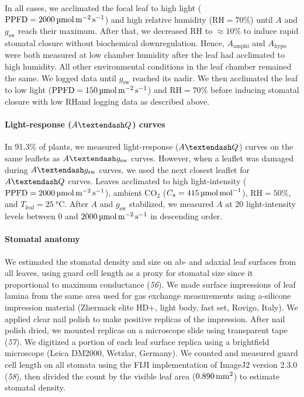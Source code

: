 \documentclass[
  letterpaper,
  DIV=11,
  numbers=noendperiod]{scrartcl}
\let\oldparagraph\paragraph
\renewcommand{\paragraph}[1]{\oldparagraph{#1}\mbox{}}
\newcommand{\Aamphi}{$A_{\mathrm{amphi}}$}
\newcommand{\Ahypo}{$A_{\mathrm{hypo}}$}
\newcommand{\agcurve}{$A \textendash g_\text{sw}$}
\newcommand{\aqcurve}{$A \textendash Q$}
\newcommand{\caequals}[1]{$C_\mathrm{a} = \qty{#1}{\micro\mol\raiseto{-1}\mol}$}
\newcommand{\gsw}{$g_\text{sw}$}
\newcommand{\ppfdequals}[1]{$\mathrm{PPFD} = \qty{#1}{\micro\mol\raiseto{-2}\meter\raiseto{-1}\second}$}
\newcommand{\rh}{$\mathrm{RH}$}
\newcommand{\rhequals}[1]{$\mathrm{RH} = #1\%$}
\newcommand{\tleafequals}[1]{$T_\mathrm{leaf} = \qty{#1}{\degreeCelsius}$}
\begin{document}
In all cases, we acclimated the focal leaf to high light
(\ppfdequals{2000}) and high relative humidity (\rhequals{70}) until
\(A\) and \gsw{} reach their maximum. After that, we decreased \rh{} to
\(\approx 10\%\) to induce rapid stomatal closure without biochemical
downregulation. Hence, \Aamphi{} and \Ahypo{} were both measured at low
chamber humidity after the leaf had acclimated to high humidity. All
other environmental conditions in the leaf chamber remained the same. We
logged data until \gsw{} reached its nadir. We then acclimated the leaf
to low light (\ppfdequals{150}) and \rhequals{70} before inducing
stomatal closure with low \rh and logging data as described above.

\paragraph{\texorpdfstring{Light-response (\aqcurve)
curves}{Light-response () curves}}\label{light-response-curves}

In 91.3\% of plants, we measured light-response (\aqcurve) curves on the
same leaflets as \agcurve{} curves. However, when a leaflet was damaged
during \agcurve{} curves, we used the next closest leaflet for
\aqcurve{} curves. Leaves acclimated to high light-intensity
(\ppfdequals{2000}), ambient CO\(_2\) (\caequals{415}), \rhequals{50},
and \tleafequals{25}. After \(A\) and \gsw{} stabilized, we measured
\(A\) at 20 light-intensity levels between \(0\) and
\(\qty{2000}{\micro\mol\raiseto{-2}\meter\raiseto{-1}\second}\) in
descending order.

\paragraph{Stomatal anatomy}\label{stomatal-anatomy}

We estimated the stomatal density and size on ab- and adaxial leaf
surfaces from all leaves, using guard cell length as a proxy for
stomatal size since it proportional to maximum conductance (\emph{56}).
We made surface impressions of leaf lamina from the same area used for
gas exchange measurements using a-silicone impression material (Zhermack
elite HD+, light body, fast set, Rovigo, Italy). We applied clear nail
polish to make positive replicas of the impression. After nail polish
dried, we mounted replicas on a microscope slide using transparent tape
(\emph{57}). We digitized a portion of each leaf surface replica using a
brightfield microscope (Leica DM2000, Wetzlar, Germany). We counted and
measured guard cell length on all stomata using the FIJI implementation
of ImageJ2 version 2.3.0 (\emph{58}), then divided the count by the
visible leaf area (\(\qty{0.890}{\raiseto{2}\milli\meter}\)) to estimate
stomatal density.
\end{document}
